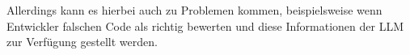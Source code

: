 Allerdings kann es hierbei auch zu Problemen kommen, beispielsweise wenn Entwickler falschen Code als richtig bewerten und diese Informationen der LLM zur Verfügung gestellt werden.

